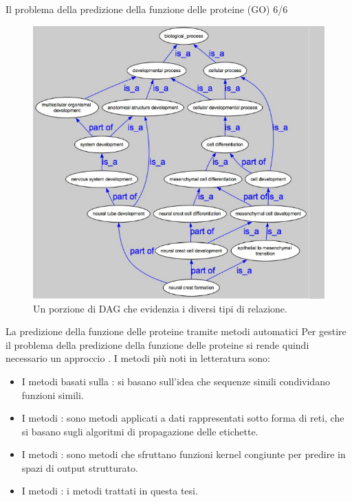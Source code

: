 \documentclass{beamer}
\begin{document}
\begin{tframe}{\small Il problema della predizione della funzione delle proteine (GO) 6/6}
\begin{figure}
\includegraphics[scale=0.24]{./img/DAG_relations.png}
\caption{\footnotesize{Un porzione di DAG che evidenzia i diversi tipi di relazione.}}
\end{figure}
\end{tframe}

\begin{tframe}{\footnotesize{La predizione della funzione delle proteine tramite metodi automatici}}
Per gestire il problema della predizione della funzione delle proteine si rende quindi necessario un approccio . I metodi più noti in letteratura sono:

\begin{itemize}
\item I metodi basati sulla : si basano sull'idea che sequenze simili condividano funzioni simili.
\item I metodi : sono metodi applicati a dati rappresentati sotto forma di reti, che si basano sugli algoritmi di propagazione delle etichette.
\item I metodi : sono metodi che sfruttano funzioni kernel congiunte per predire in spazi di output strutturato.
\item I metodi : i metodi trattati in questa tesi.
\end{itemize}

\end{tframe}
\end{document}
